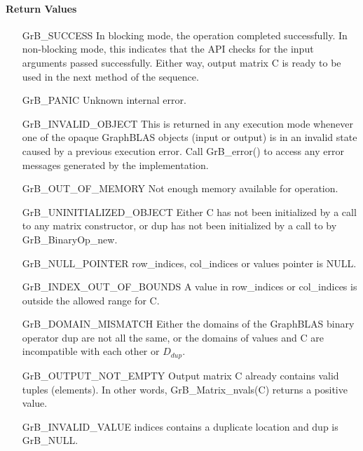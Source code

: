 \paragraph{Return Values}

\begin{itemize}[leftmargin=2.3in]
    \item[{\sf GrB\_SUCCESS}]         In blocking mode, the operation completed
    successfully. In non-blocking mode, this indicates that the API checks 
    for the input arguments passed successfully. Either way, output matrix 
    {\sf C} is ready to be used in the next method of the sequence.

    \item[{\sf GrB\_PANIC}]           Unknown internal error.
    
    \item[{\sf GrB\_INVALID\_OBJECT}] This is returned in any execution mode 
    whenever one of the opaque GraphBLAS objects (input or output) is in an invalid 
    state caused by a previous execution error.  Call {\sf GrB\_error()} to access 
    any error messages generated by the implementation.

    \item[{\sf GrB\_OUT\_OF\_MEMORY}] Not enough memory available for operation.
    
    \item[{\sf GrB\_UNINITIALIZED\_OBJECT}]  Either {\sf C} has not been 
    initialized by a call to any matrix constructor, or
    {\sf dup} has not been initialized by a call to {\sf by GrB\_BinaryOp\_new}.
    
    \item[{\sf GrB\_NULL\_POINTER}]  {\sf row\_indices}, 
    {\sf col\_indices} or {\sf values} pointer is {\sf NULL}.

    \item[{\sf GrB\_INDEX\_OUT\_OF\_BOUNDS}] A value in {\sf row\_indices} or
    {\sf col\_indices} is outside the allowed range for {\sf C}.

	\item[{\sf GrB\_DOMAIN\_MISMATCH}]    Either the domains of the GraphBLAS 
    binary operator {\sf dup} are not all the same, or the domains of 
    {\sf values} and {\sf C} are incompatible with each other or $D_{dup}$.
	
	\item[{\sf GrB\_OUTPUT\_NOT\_EMPTY}]    Output matrix {\sf C} already contains valid tuples (elements).
	In other words, {\sf GrB\_Matrix\_nvals(C)} returns a positive value.
    
    \item[{\sf GrB\_INVALID\_VALUE}] {\sf indices} contains a duplicate location
    and {\sf dup} is {\sf GrB\_NULL}. 
\end{itemize}

